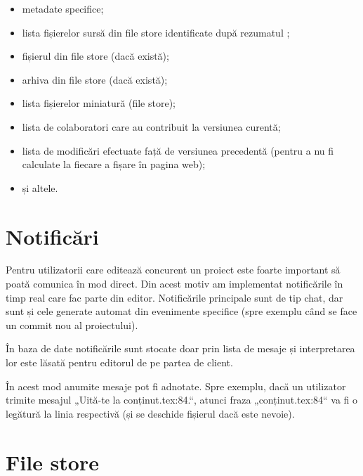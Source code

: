 \documentclass[a4wide,12pt]{report}
\newcommand{\eng}[1]{{#1}} %
\newcommand{\acr}[1]{{\textsmaller[1]{\textsc{#1}}}} %
\begin{document}
\begin{itemize}

\item metadate specifice;

\item lista fișierelor sursă din \eng{file store} identificate după rezumatul
\acr{SHA1};

\item fișierul \acr{PDF} din \eng{file store} (dacă există);

\item arhiva \acr{ZIP} din \eng{file store} (dacă există);

\item lista fișierelor miniatură (\eng{file store});

\item lista de colaboratori care au contribuit la versiunea curentă;

\item lista de modificări efectuate față de versiunea precedentă (pentru a nu fi
calculate la fiecare a fișare în pagina web);

\item și altele.

\end{itemize}

\section{Notificări}
\label{notificarisec}

Pentru utilizatorii care editează concurent un proiect este foarte important să
poată comunica în mod direct. Din acest motiv am implementat notificările în
timp real care fac parte din editor. Notificările principale sunt de tip
\eng{chat}, dar sunt și cele generate automat din evenimente specifice (spre
exemplu când se face un \eng{commit} nou al proiectului).

În baza de date notificările sunt stocate doar prin lista de mesaje și
interpretarea lor este lăsată pentru editorul de pe partea de client.

În acest mod anumite mesaje pot fi adnotate. Spre exemplu, dacă un utilizator
trimite mesajul „Uită-te la conținut.tex:84.“, atunci fraza „conținut.tex:84“ va
fi o legătură la linia respectivă (și se deschide fișierul dacă este nevoie).

\section{\eng{File store}}
\label{filestoresec}
\end{document}
